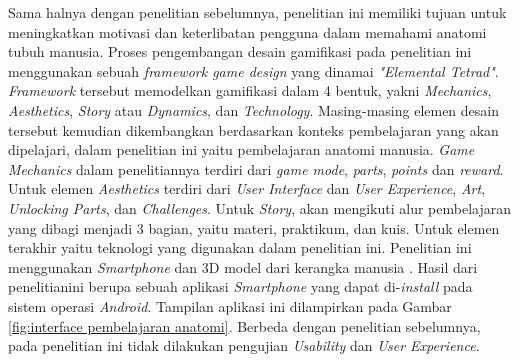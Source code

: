 Sama halnya dengan penelitian sebelumnya, penelitian ini memiliki tujuan untuk meningkatkan motivasi dan keterlibatan pengguna dalam memahami anatomi tubuh manusia.
Proses pengembangan desain gamifikasi pada penelitian ini menggunakan sebuah \textit{framework game design} yang dinamai \textit{"Elemental Tetrad"}\cite{AnatomyGamification}.
\textit{Framework} tersebut memodelkan gamifikasi dalam 4 bentuk, yakni \textit{Mechanics}, \textit{Aesthetics}, \textit{Story} atau \textit{Dynamics}, dan \textit{Technology}\cite{marisa2020gamifikasi}.
Masing-masing elemen desain tersebut kemudian dikembangkan berdasarkan konteks pembelajaran yang akan dipelajari, dalam penelitian ini yaitu pembelajaran anatomi manusia.
\textit{Game Mechanics} dalam penelitiannya terdiri dari \textit{game mode}, \textit{parts}, \textit{points} dan \textit{reward}. 
Untuk elemen \textit{Aesthetics} terdiri dari \textit{ User Interface} dan \textit{User Experience}, \textit{Art}, \textit{Unlocking Parts}, dan \textit{Challenges}.
Untuk \textit{Story}, akan mengikuti alur pembelajaran yang dibagi menjadi 3 bagian, yaitu materi, praktikum, dan kuis\cite{AnatomyGamification}.
Untuk elemen terakhir yaitu teknologi yang digunakan dalam penelitian ini. Penelitian ini menggunakan \textit{Smartphone} dan 3D model dari kerangka manusia \cite{AnatomyGamification}.
Hasil dari penelitianini berupa sebuah aplikasi \textit{Smartphone} yang dapat di-\textit{install} pada sistem operasi \textit{Android}.
Tampilan aplikasi ini dilampirkan pada Gambar \ref*{fig:interface pembelajaran anatomi}.
Berbeda dengan penelitian sebelumnya, pada penelitian ini tidak dilakukan pengujian \textit{Usability} dan \textit{User Experience}.
